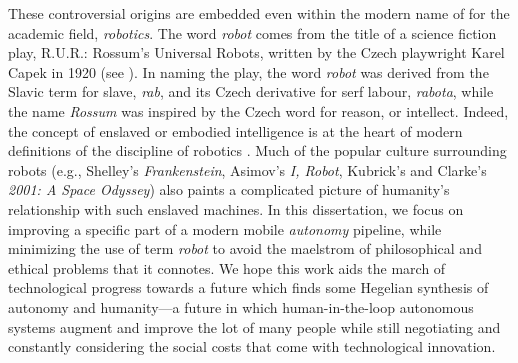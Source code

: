 These controversial origins are embedded even within the modern name of for the academic field, \textit{robotics}. The word \textit{robot} comes from the title of a science fiction play, R.U.R.: Rossum's Universal Robots, written by the Czech playwright Karel Capek in 1920 (see ). In naming the play, the word \textit{robot} was derived from the Slavic term for slave, \textit{rab}, and its Czech derivative for serf labour, \textit{rabota}, while the name \textit{Rossum} was inspired by the Czech word for reason, or intellect. Indeed, the concept of enslaved or embodied  intelligence is at the heart of modern definitions of the discipline of robotics \citep{Redfield2019-pi}. Much of the popular culture surrounding robots (e.g., Shelley's \textit{Frankenstein}, Asimov's \textit{I, Robot}, Kubrick's and Clarke's \textit{2001: A Space Odyssey}) also paints a complicated picture of humanity's relationship with such enslaved machines. In this dissertation, we focus on improving a specific part of a modern mobile \textit{autonomy} pipeline, while minimizing the use of term \textit{robot} to avoid the maelstrom of philosophical and ethical problems that it connotes. We hope this work aids the march of technological progress towards a future which finds some Hegelian synthesis of autonomy and humanity---a future in which human-in-the-loop autonomous systems augment and improve the lot of many people while still negotiating and constantly considering the social costs that come with technological innovation.
